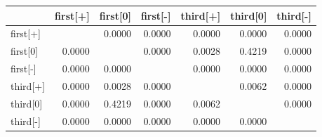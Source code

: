 \begin{tabular}{lrrrrrr}
    \toprule
             & first[+] & first[0] & first[-] & third[+] & third[0] & third[-] \\
    \midrule
    first[+] &          & 0.0000   & 0.0000   & 0.0000   & 0.0000   & 0.0000   \\
    first[0] & 0.0000   &          & 0.0000   & 0.0028   & 0.4219   & 0.0000   \\
    first[-] & 0.0000   & 0.0000   &          & 0.0000   & 0.0000   & 0.0000   \\
    third[+] & 0.0000   & 0.0028   & 0.0000   &          & 0.0062   & 0.0000   \\
    third[0] & 0.0000   & 0.4219   & 0.0000   & 0.0062   &          & 0.0000   \\
    third[-] & 0.0000   & 0.0000   & 0.0000   & 0.0000   & 0.0000   &          \\
    \bottomrule
\end{tabular}

